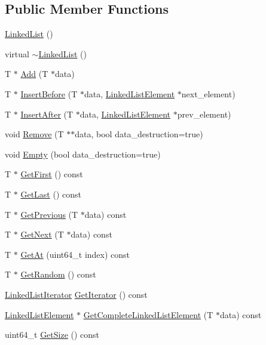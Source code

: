 \subsection*{Public Member Functions}
\begin{DoxyCompactItemize}
\item 
\hyperlink{classmage_1_1_linked_list_a44b43c51b9515695016c8664d898aa6b}{Linked\+List} ()
\item 
virtual \hyperlink{classmage_1_1_linked_list_a88cb2ec52e90f3658d9735b4948cccdb}{$\sim$\+Linked\+List} ()
\item 
T $\ast$ \hyperlink{classmage_1_1_linked_list_ac6cd236aab89f296d3c112c05b2337e2}{Add} (T $\ast$data)
\item 
T $\ast$ \hyperlink{classmage_1_1_linked_list_a5744f0c1ae3b9e752dffdd3fdb518f5c}{Insert\+Before} (T $\ast$data, \hyperlink{structmage_1_1_linked_list_1_1_linked_list_element}{Linked\+List\+Element} $\ast$next\+\_\+element)
\item 
T $\ast$ \hyperlink{classmage_1_1_linked_list_a25424001f549e03d785a219d99231044}{Insert\+After} (T $\ast$data, \hyperlink{structmage_1_1_linked_list_1_1_linked_list_element}{Linked\+List\+Element} $\ast$prev\+\_\+element)
\item 
void \hyperlink{classmage_1_1_linked_list_a3bf5b2c799c9439804949ffed0c79a13}{Remove} (T $\ast$$\ast$data, bool data\+\_\+destruction=true)
\item 
void \hyperlink{classmage_1_1_linked_list_a4176d80548f1ec5ca98fb18c16339de8}{Empty} (bool data\+\_\+destruction=true)
\item 
T $\ast$ \hyperlink{classmage_1_1_linked_list_a8394fd1c390b806b9daafdff497b02fb}{Get\+First} () const
\item 
T $\ast$ \hyperlink{classmage_1_1_linked_list_a734f6dc6d073edd99eb9a0ac1f605900}{Get\+Last} () const
\item 
T $\ast$ \hyperlink{classmage_1_1_linked_list_a48a61ad79c7a7f4d460d56867ce62cf4}{Get\+Previous} (T $\ast$data) const
\item 
T $\ast$ \hyperlink{classmage_1_1_linked_list_a992390dbc48cf24705f9e79baef37061}{Get\+Next} (T $\ast$data) const
\item 
T $\ast$ \hyperlink{classmage_1_1_linked_list_a97922b200a12979e5c8692dd5f3f73d1}{Get\+At} (uint64\+\_\+t index) const
\item 
T $\ast$ \hyperlink{classmage_1_1_linked_list_aec571022e5fa10e0afea286e4427eb89}{Get\+Random} () const
\item 
\hyperlink{structmage_1_1_linked_list_1_1_linked_list_iterator}{Linked\+List\+Iterator} \hyperlink{classmage_1_1_linked_list_a7e4016d051e44eb5d8a7bde3d193b9e8}{Get\+Iterator} () const
\item 
\hyperlink{structmage_1_1_linked_list_1_1_linked_list_element}{Linked\+List\+Element} $\ast$ \hyperlink{classmage_1_1_linked_list_a0da4ff247abafd3a496b379673c111c1}{Get\+Complete\+Linked\+List\+Element} (T $\ast$data) const
\item 
uint64\+\_\+t \hyperlink{classmage_1_1_linked_list_a8d033278680a0053e30cba91b27941a1}{Get\+Size} () const
\end{DoxyCompactItemize}
